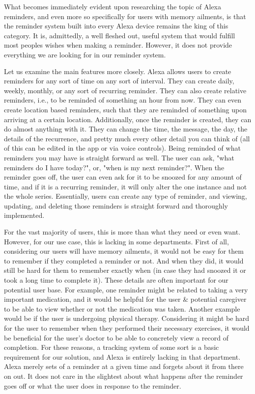 \documentclass[11pt, oneside]{article}
\begin{document}
What becomes immediately evident upon researching the topic of Alexa reminders, and even more so specifically for users with memory ailments, is that the reminder system built into every Alexa device remains the king of this category. 
It is, admittedly, a well fleshed out, useful system that would fulfill most peoples wishes when making a reminder. 
However, it does not provide everything we are looking for in our reminder system. 

Let us examine the main features more closely. 
Alexa allows users to create reminders for any sort of time on any sort of interval. 
They can create daily, weekly, monthly, or any sort of recurring reminder. 
They can also create relative reminders, i.e., to be reminded of something an hour from now. 
They can even create location based reminders, such that they are reminded of something upon arriving at a certain location. 
Additionally, once the reminder is created, they can do almost anything with it. 
They can change the time, the message, the day, the details of the recurrence, and pretty much every other detail you can think of (all of this can be edited in the app or via voice controls).
Being reminded of what reminders you may have is straight forward as well. The user can ask, "what reminders do I have today?", or, "when is my next reminder?". 
When the reminder goes off, the user can even ask for it to be snoozed for any amount of time, and if it is a recurring reminder, it will only alter the one instance and not the whole series. 
Essentially, users can create any type of reminder, and viewing, updating, and deleting those reminders is straight forward and thoroughly implemented.  

For the vast majority of users, this is more than what they need or even want. 
However, for our use case, this is lacking in some departments. 
First of all, considering our users will have memory ailments, it would not be easy for them to remember if they completed a reminder or not. 
And when they did, it would still be hard for them to remember exactly when (in case they had snoozed it or took a long time to complete it).
These details are often important for our potential user base. 
For example, one reminder might be related to taking a very important medication, and it would be helpful for the user \& potential caregiver to be able to view whether or not the medication was taken. 
Another example would be if the user is undergoing physical therapy. Considering it might be hard for the user to remember when they performed their necessary exercises, it would be beneficial for the user's doctor to be able to concretely view a record of completion. 
For these reasons, a tracking system of some sort is a basic requirement for our solution, and Alexa is entirely lacking in that department. 
Alexa merely sets of a reminder at a given time and forgets about it from there on out. 
It does not care in the slightest about what happens after the reminder goes off or what the user does in response to the reminder. 
\end{document}
